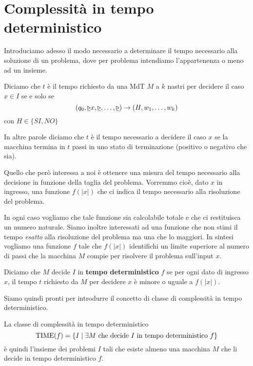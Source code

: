 \section{Complessità in tempo deterministico}

Introduciamo adesso il modo necessario a determinare il tempo
necessario alla soluzione di un problema, dove per problema
intendiamo l'appartenenza o meno ad un insieme.

\begin{definition}
	Diciamo che $t$ è il tempo richiesto da una MdT $M$ a $k$
	nastri per decidere il caso $x \in I$ se e solo se
	\[
		(q_0, \underline{\triangleright} x, \underline{\triangleright}, \dots,
		\underline{\triangleright}) \to (H, w_1, \dots, w_k)
	\]
	con $H \in \{ SI, NO \}$
\end{definition}

In altre parole diciamo che $t$ è il tempo necessario a decidere
il caso $x$ se la macchina termina in $t$ passi in uno stato di
terminazione (positivo o negativo che sia).

Quello che però interessa a noi è ottenere una misura del tempo
necessario alla decisione in funzione della taglia del problema.
Vorremmo cioè, dato $x$ in ingresso, una funzione $f(|x|)$ che
ci indica il tempo necessario alla risoluzione del problema.

In ogni caso vogliamo che tale funzione sia calcolabile totale
e che ci restituisca un numero naturale. Siamo inoltre
interessati ad una funzione che non stimi il tempo \emph{esatto}
alla risoluzione del problema ma una che lo maggiori. In sintesi
vogliamo una funzione $f$ tale che $f(|x|)$ identifichi un limite
superiore al numero di passi che la macchina $M$ compie per
risolvere il problema sull'input $x$.

\begin{definition}
	Diciamo che $M$ decide $I$ in \textbf{tempo deterministico}
	$f$ se per ogni dato di ingresso $x$, il tempo $t$ richiesto
	da $M$ per decidere $x$ è minore o uguale a $f(|x|)$.
\end{definition}

Siamo quindi pronti per introdurre il concetto di classe di
complessità in tempo deterministico.

\begin{definition}
	La classe di complessità in tempo deterministico
	\[
		\operatorname{TIME} (f) = \{ I \mid \exists M \text{ che decide }
		I \text{ in tempo deterministico } f \}
	\]
	è quindi l'insieme dei problemi $I$ tali che esiste almeno
	una macchina $M$ che li decide in tempo deterministico $f$.
\end{definition}

